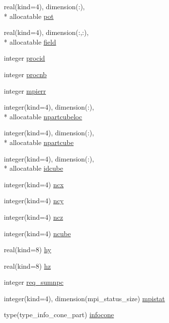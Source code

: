 \begin{DoxyCompactItemize}
\item 
real(kind=4), dimension(\-:), \\*
allocatable \hyperlink{classmodvariables_a872451e872cc528b38bd43f2ed09b446}{pot}
\item 
real(kind=4), dimension(\-:,\-:), \\*
allocatable \hyperlink{classmodvariables_a07bff5345df2040ae2d0f7e6d67f9a5c}{field}
\item 
integer \hyperlink{classmodvariables_a27cda3ac7f6a8948a5f95e7dfa724167}{procid}
\item 
integer \hyperlink{classmodvariables_ae51b502acd90a80a0134e81f92fbac15}{procnb}
\item 
integer \hyperlink{classmodvariables_ab580e2bdf8eff875402911526f873de2}{mpierr}
\item 
integer(kind=4), dimension(\-:), \\*
allocatable \hyperlink{classmodvariables_a32098f5e276eab031b1feebf7124f8bf}{npartcubeloc}
\item 
integer(kind=4), dimension(\-:), \\*
allocatable \hyperlink{classmodvariables_a8cd49c574b692bbeae7029e8d138f58e}{npartcube}
\item 
integer(kind=4), dimension(\-:), \\*
allocatable \hyperlink{classmodvariables_a22925cb23ea4a80a06b3f4b67b62102e}{idcube}
\item 
integer(kind=4) \hyperlink{classmodvariables_ab3c5e83108d2cc8318f235c1f889a162}{ncx}
\item 
integer(kind=4) \hyperlink{classmodvariables_a1c1ff1a91ab25fd963a4ce5302249978}{ncy}
\item 
integer(kind=4) \hyperlink{classmodvariables_ab75f9f5dd0ce07892cca908373a51ddc}{ncz}
\item 
integer(kind=4) \hyperlink{classmodvariables_ab094334ab9c4ab8644017abf18dcd25f}{ncube}
\item 
real(kind=8) \hyperlink{classmodvariables_a31a775c0bcadfce141cc3cebf22df9ff}{hy}
\item 
real(kind=8) \hyperlink{classmodvariables_a26d18952766121089d4309f2449d8b29}{hz}
\item 
integer \hyperlink{classmodvariables_a64644f9282a9c19faf8ccb44b0e60877}{req\-\_\-sumnpc}
\item 
integer(kind=4), dimension(mpi\-\_\-status\-\_\-size) \hyperlink{classmodvariables_af6d0e7b2912dcb50b21940d5f8658be4}{mpistat}
\item 
type(type\-\_\-info\-\_\-cone\-\_\-part) \hyperlink{classmodvariables_ad22024085a623d456c41ca16222120a6}{infocone}

\end{DoxyCompactItemize}
